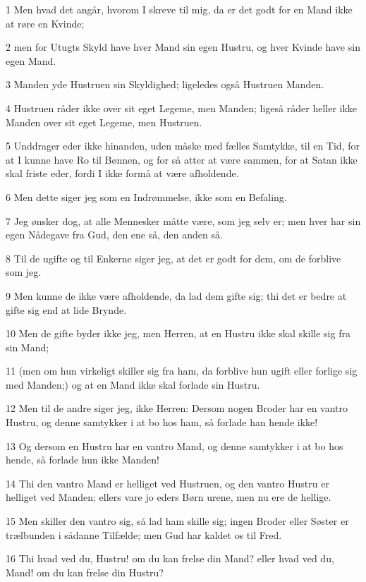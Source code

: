 \par 1 Men hvad det angår, hvorom I skreve til mig, da er det godt for en Mand ikke at røre en Kvinde;
\par 2 men for Utugts Skyld have hver Mand sin egen Hustru, og hver Kvinde have sin egen Mand.
\par 3 Manden yde Hustruen sin Skyldighed; ligeledes også Hustruen Manden.
\par 4 Hustruen råder ikke over sit eget Legeme, men Manden; ligeså råder heller ikke Manden over sit eget Legeme, men Hustruen.
\par 5 Unddrager eder ikke hinanden, uden måske med fælles Samtykke, til en Tid, for at I kunne have Ro til Bønnen, og for så atter at være sammen, for at Satan ikke skal friste eder, fordi I ikke formå at være afholdende.
\par 6 Men dette siger jeg som en Indrømmelse, ikke som en Befaling.
\par 7 Jeg ønsker dog, at alle Mennesker måtte være, som jeg selv er; men hver har sin egen Nådegave fra Gud, den ene så, den anden så.
\par 8 Til de ugifte og til Enkerne siger jeg, at det er godt for dem, om de forblive som jeg.
\par 9 Men kunne de ikke være afholdende, da lad dem gifte sig; thi det er bedre at gifte sig end at lide Brynde.
\par 10 Men de gifte byder ikke jeg, men Herren, at en Hustru ikke skal skille sig fra sin Mand;
\par 11 (men om hun virkeligt skiller sig fra ham, da forblive hun ugift eller forlige sig med Manden;) og at en Mand ikke skal forlade sin Hustru.
\par 12 Men til de andre siger jeg, ikke Herren: Dersom nogen Broder har en vantro Hustru, og denne samtykker i at bo hos ham, så forlade han hende ikke!
\par 13 Og dersom en Hustru har en vantro Mand, og denne samtykker i at bo hos hende, så forlade hun ikke Manden!
\par 14 Thi den vantro Mand er helliget ved Hustruen, og den vantro Hustru er helliget ved Manden; ellers vare jo eders Børn urene, men nu ere de hellige.
\par 15 Men skiller den vantro sig, så lad ham skille sig; ingen Broder eller Søster er trælbunden i sådanne Tilfælde; men Gud har kaldet os til Fred.
\par 16 Thi hvad ved du, Hustru! om du kan frelse din Mand? eller hvad ved du, Mand! om du kan frelse din Hustru?
